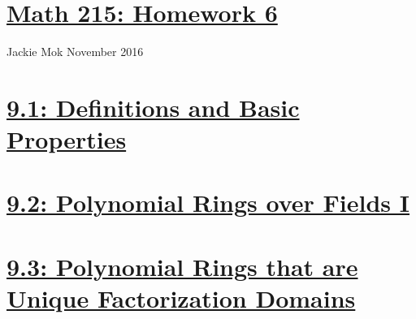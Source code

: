 \documentclass{article}
\begin{document}
\section*{\underline{Math 215: Homework 6}}
Jackie Mok
 November 2016

\section*{\underline{9.1: Definitions and Basic Properties}}


\section*{\underline{9.2: Polynomial Rings over Fields I}}

\section*{\underline{9.3: Polynomial Rings that are Unique Factorization Domains}}

\end{document}

